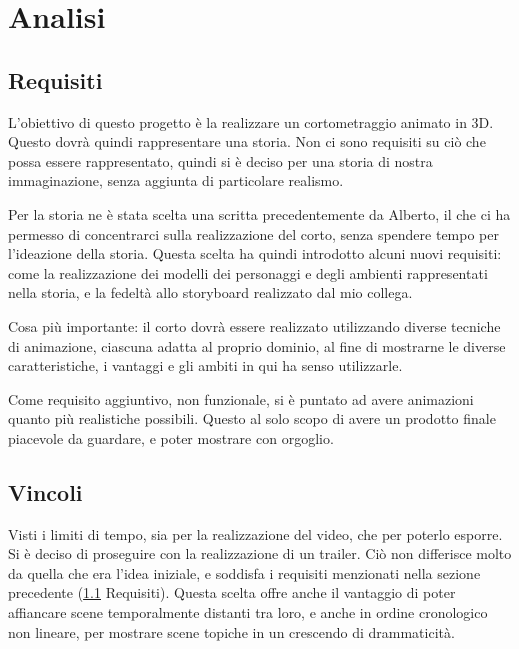 
\chapter{Analisi} %

\label{Chapter2} %

\section{Requisiti} \label{req}
L'obiettivo di questo progetto è la realizzare un cortometraggio animato in 3D.
Questo dovrà quindi rappresentare una storia. Non ci sono requisiti su ciò che possa essere rappresentato, quindi si è deciso per una storia di nostra immaginazione, senza aggiunta di particolare realismo.

Per la storia ne è stata scelta una scritta precedentemente da Alberto, il che ci ha permesso di concentrarci sulla realizzazione del corto, senza spendere tempo per l'ideazione della storia. Questa scelta ha quindi introdotto alcuni nuovi requisiti: come la realizzazione dei modelli dei personaggi e degli ambienti rappresentati nella storia, e la fedeltà allo storyboard realizzato dal mio collega.

Cosa più importante: il corto dovrà essere realizzato utilizzando diverse tecniche di animazione, ciascuna adatta al proprio dominio, al fine di mostrarne le diverse caratteristiche, i vantaggi e gli ambiti in qui ha senso utilizzarle.

Come requisito aggiuntivo, non funzionale, si è puntato ad avere animazioni quanto più realistiche possibili. Questo al solo scopo di avere un prodotto finale piacevole da guardare, e poter mostrare con orgoglio.

\section{Vincoli} 
Visti i limiti di tempo, sia per la realizzazione del video, che per poterlo esporre. Si è deciso di proseguire con la realizzazione di un trailer. Ciò non differisce molto da quella che era l'idea iniziale, e soddisfa i requisiti menzionati nella sezione precedente (\ref{req} Requisiti). Questa scelta offre anche il vantaggio di poter affiancare scene temporalmente distanti tra loro, e anche in ordine cronologico non lineare, per mostrare scene topiche in un crescendo di drammaticità.

